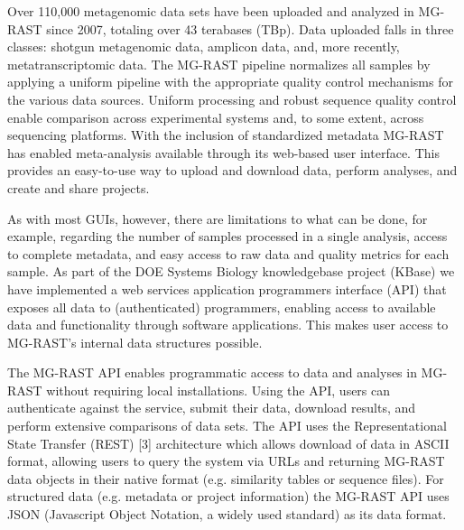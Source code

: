 


Over 110,000 metagenomic data sets have been uploaded and analyzed in MG-RAST since 2007, totaling over 43 terabases (TBp). Data uploaded falls in three classes: shotgun metagenomic data, amplicon data, and, more recently, metatranscriptomic data. The MG-RAST pipeline normalizes all samples by applying a uniform pipeline with the appropriate quality control mechanisms for the various data sources. Uniform processing and robust sequence quality control enable comparison across experimental systems and, to some extent, across sequencing platforms. With the inclusion of standardized metadata MG-RAST has enabled meta-analysis available through its web-based user interface. This provides an easy-to-use way to upload and download data, perform analyses, and create and share projects.

As with most GUIs, however, there are limitations to what can be done, for example, regarding the number of samples processed in a single analysis, access to complete metadata, and easy access to raw data and quality metrics for each sample. As part of the DOE Systems Biology knowledgebase project (KBase) we have implemented a web services application programmers interface (API) that exposes all data to (authenticated) programmers, enabling access to available data and functionality through software applications. This makes user access to MG-RAST's internal data structures possible.

The MG-RAST API enables programmatic access to data and analyses in MG-RAST without requiring local installations. Using the API, users can authenticate against the service, submit their data, download results, and perform extensive comparisons of data sets. The API uses the Representational State Transfer (REST) [3] architecture which allows download of data in ASCII format, allowing users to query the system via URLs and returning MG-RAST data objects in their native format (e.g. similarity tables or sequence files). For structured data (e.g. metadata or project information) the MG-RAST API uses JSON (Javascript Object Notation, a widely used standard) as its data format.

